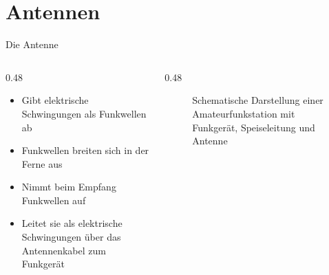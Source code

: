 \section{Antennen}
\label{section:antennen}
\begin{frame}{Die Antenne}
    \begin{columns}
        \begin{column}{0.48\linewidth}
            \begin{itemize}
                \item Gibt elektrische Schwingungen als Funkwellen ab
                \item Funkwellen breiten sich in der Ferne aus
                \item Nimmt beim Empfang Funkwellen auf
                \item Leitet sie als elektrische Schwingungen über das Antennenkabel zum Funkgerät
            \end{itemize}
        \end{column}
        \begin{column}{0.48\linewidth}
            \begin{figure}
                \caption{\scriptsize Schematische Darstellung einer Amateurfunkstation mit Funkgerät, Speiseleitung und Antenne}
                \label{n_trx_kabel_und_antenne}
            \end{figure}
        \end{column}
    \end{columns}
\end{frame}

\begin{frame}
\end{frame}%
